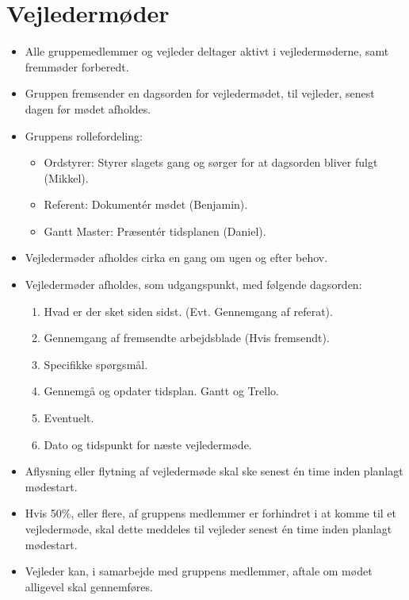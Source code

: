 \documentclass[11pt]{article}
\begin{document}
\section{Vejledermøder}
\begin{itemize}
    \item Alle gruppemedlemmer og vejleder deltager aktivt i vejledermøderne, samt fremmøder forberedt.
    \item Gruppen fremsender en dagsorden for vejledermødet, til vejleder, senest dagen før mødet afholdes.
    \item Gruppens rollefordeling:
    \begin{itemize}
        \item Ordstyrer: Styrer slagets gang og sørger for at dagsorden bliver fulgt (Mikkel).
        \item Referent: Dokumentér mødet (Benjamin).
        \item Gantt Master: Præsentér tidsplanen (Daniel).
    \end{itemize}
    \item Vejledermøder afholdes cirka en gang om ugen og efter behov.
    \item Vejledermøder afholdes, som udgangspunkt, med følgende dagsorden:
    \begin{enumerate}
        \item Hvad er der sket siden sidst. (Evt. Gennemgang af referat).
        \item Gennemgang af fremsendte arbejdsblade (Hvis fremsendt).
        \item Specifikke spørgsmål.
        \item Gennemgå og opdater tidsplan. Gantt og Trello.
        \item Eventuelt.
        \item Dato og tidspunkt for næste vejledermøde.
    \end{enumerate}
    \item Aflysning eller flytning af vejledermøde skal ske senest én time inden planlagt mødestart.
    \item Hvis 50\%, eller flere, af gruppens medlemmer er forhindret i at komme til et vejledermøde, skal dette meddeles til vejleder senest én time inden planlagt mødestart.
    \item Vejleder kan, i samarbejde med gruppens medlemmer, aftale om mødet alligevel skal gennemføres.
\end{itemize}
\end{document}
